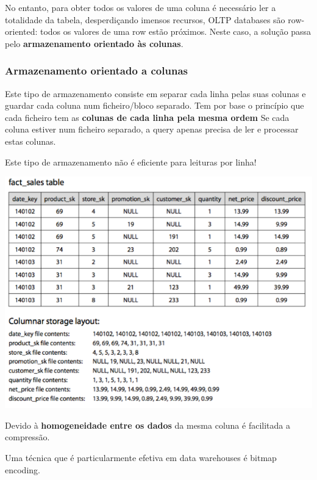 \documentclass{article}
\begin{document}
\vspace{2mm}

No entanto, para obter todos os valores de uma coluna é necessário ler a totalidade da tabela,
desperdiçando imensos recursos, OLTP databases são row-oriented: todos os valores de uma row
estão próximos. Neste caso, a solução passa pelo \textbf{armazenamento orientado
às colunas}.

\pagebreak

\subsubsection{Armazenamento orientado a colunas}

Este tipo de armazenamento consiste em separar cada linha
pelas suas colunas e guardar cada coluna num ficheiro/bloco
separado. Tem por base o princípio que cada ficheiro tem as
\textbf{colunas de cada linha pela mesma ordem}
Se cada coluna estiver num ficheiro separado,
a query apenas precisa de ler e processar estas colunas.

Este tipo de armazenamento não é eficiente para leituras por linha!

\begin{center}
  \includegraphics[scale=0.3]{51}
\end{center}

Devido à \textbf{homogeneidade entre os dados} da mesma coluna é facilitada a compressão.

Uma técnica que é particularmente efetiva em data warehouses é bitmap encoding.

\vspace{2mm}
\end{document}
